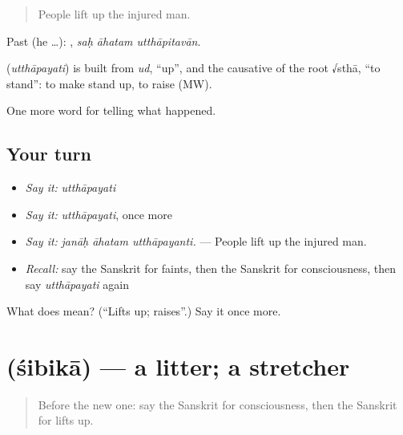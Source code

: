 \begin{quote}
People lift up the injured man.
\end{quote}

Past (he …):   , \emph{saḥ āhatam utthāpitavān}.

\begin{cousinweb}
\textbf{} (\emph{utthāpayati}) is built from \emph{ud}, \textquotedblleft{}up\textquotedblright{}, and the causative of the root √sthā, \textquotedblleft{}to stand\textquotedblright{}: to make stand up, to raise (MW).
\end{cousinweb}

\begin{grammarlens}[title={What you've built}]
One more word for telling what happened.
\end{grammarlens}

\subsection*{Your turn}
\begin{itemize}
\raggedright
  \item \emph{Say it:} \emph{utthāpayati}
  \item \emph{Say it:} \emph{utthāpayati}, once more
  \item \emph{Say it:} \emph{janāḥ āhatam utthāpayanti.} — People lift up the injured man.
  \item \emph{Recall:} say the Sanskrit for faints, then the Sanskrit for consciousness, then say \emph{utthāpayati} again
\end{itemize}

\begin{tcolorbox}[breakable,colback=teal!4,colframe=teal!35!black,title={Before you move on}]
What does  mean? (\textquotedblleft{}Lifts up; raises\textquotedblright{}.) Say it once more.
\end{tcolorbox}
\section[\texorpdfstring{\sk{शिबिका} (śibikā)}{शिबिका (śibikā)}]{ (śibikā) — a litter; a stretcher}

\label{lesson:SA-C295-sibika}



\begin{quote}
Before the new one: say the Sanskrit for consciousness, then the Sanskrit for lifts up.
\end{quote}

